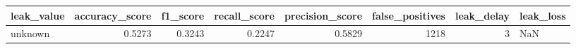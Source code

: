 \begin{tabular}{lrrrrrrl}
\toprule
leak\_value & accuracy\_score & f1\_score & recall\_score & precision\_score & false\_positives & leak\_delay & leak\_loss \\
\midrule
unknown & 0.5273 & 0.3243 & 0.2247 & 0.5829 & 1218 & 3 & NaN \\
\bottomrule
\end{tabular}
